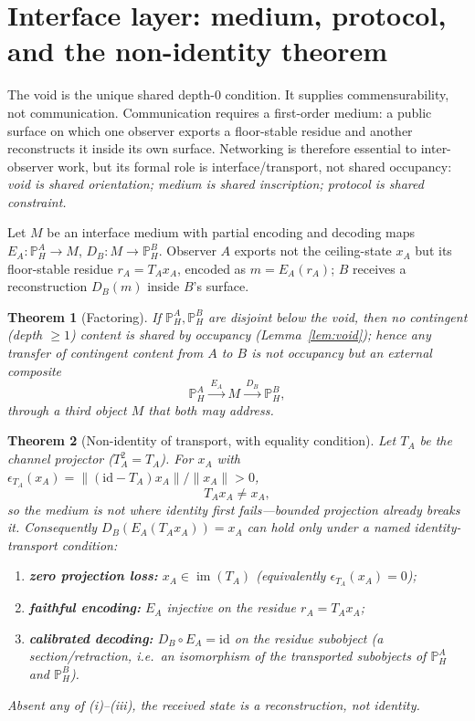 \documentclass[11pt]{article}
\newtheorem{theorem}{Theorem}
\theoremstyle{definition}
\theoremstyle{remark}
\newcommand{\PH}{\mathbb{P}_{H}}
\begin{document}
\section{Interface layer: medium, protocol, and the non-identity theorem}\label{sec:interface}

The void is the unique shared depth-$0$ condition. It supplies commensurability, not communication.
Communication requires a first-order medium: a public surface on which one observer exports a
floor-stable residue and another reconstructs it inside its own surface. Networking is therefore
essential to inter-observer work, but its formal role is interface/transport, not shared occupancy:
\emph{void is shared orientation; medium is shared inscription; protocol is shared constraint.}

Let $M$ be an interface medium with partial encoding and decoding maps $E_A:\PH^A\to M$,
$D_B:M\to\PH^B$. Observer $A$ exports not the ceiling-state $x_A$ but its floor-stable residue
$r_A=T_Ax_A$, encoded as $m=E_A(r_A)$; $B$ receives a reconstruction $D_B(m)$ inside $B$'s surface.

\begin{theorem}[Factoring]\label{thm:factor}
If $\PH^A,\PH^B$ are disjoint below the void, then no contingent (depth $\ge 1$) content is shared by
occupancy (Lemma~\ref{lem:void}); hence any transfer of contingent content from $A$ to $B$ is not
occupancy but an external composite
\[
  \PH^A \xrightarrow{\ E_A\ } M \xrightarrow{\ D_B\ } \PH^B ,
\]
through a third object $M$ that both may address.
\end{theorem}

\begin{theorem}[Non-identity of transport, with equality condition]\label{thm:nonid}
Let $T_A$ be the channel projector ($T_A^2=T_A$). For $x_A$ with
$\epsilon_{T_A}(x_A)=\|(\mathrm{id}-T_A)x_A\|/\|x_A\|>0$,
\[
  T_Ax_A\neq x_A,
\]
so the medium is \emph{not} where identity first fails---bounded projection already breaks it.
Consequently $D_B(E_A(T_Ax_A))=x_A$ can hold only under a \emph{named identity-transport condition}:
\begin{enumerate}[leftmargin=1.8em,label=(\roman*)]
\item \textbf{zero projection loss:} $x_A\in\operatorname{im}(T_A)$ (equivalently $\epsilon_{T_A}(x_A)=0$);
\item \textbf{faithful encoding:} $E_A$ injective on the residue $r_A=T_Ax_A$;
\item \textbf{calibrated decoding:} $D_B\circ E_A=\mathrm{id}$ on the residue subobject (a
  section/retraction, i.e.\ an isomorphism of the transported subobjects of $\PH^A$ and $\PH^B$).
\end{enumerate}
Absent any of (i)--(iii), the received state is a reconstruction, not identity.
\end{theorem}
\end{document}
